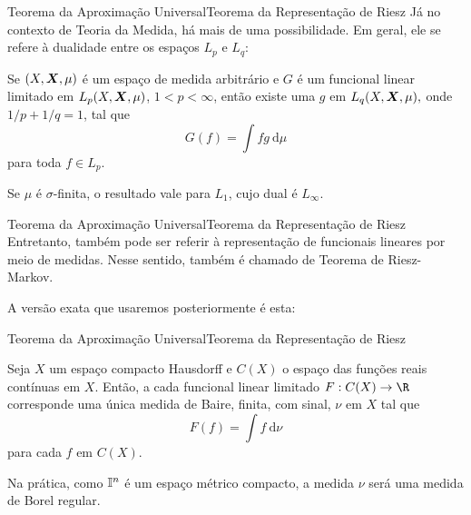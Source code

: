 \documentclass[13pt]{beamer}
\begin{document}
\begin{frame}{Teorema da Aproximação Universal}{Teorema da Representação de Riesz}%
    Já no contexto de Teoria da Medida, há mais de uma possibilidade.
    Em geral, ele se refere à dualidade entre os espaços \( L_{ p } \) e \( L_{ q } \):
    \begin{teo*}
        Se \( ( X, \bm{X}, \mu ) \) é um espaço de medida arbitrário e \( G \) é um funcional linear limitado em \( L_{ p } ( X, \bm{X}, \mu ) \), \( 1 < p < \infty \), então existe uma \( g \) em \( L_{ q } ( X, \bm{X}, \mu ), \) onde \( 1/p + 1/q = 1 \), tal que
        \begin{equation*}
            G ( f ) = \int f g \ \mathrm{d} \mu
        \end{equation*}
        para toda \( f \in L_{ p } \).
    \end{teo*}
    Se \( \mu \) é \( \sigma \)-finita, o resultado vale para \( L_{ 1 } \), cujo dual é \( L_{ \infty } \).
\end{frame}

\begin{frame}{Teorema da Aproximação Universal}{Teorema da Representação de Riesz}%
    Entretanto, também pode ser referir à representação de funcionais lineares por meio de medidas.
    Nesse sentido, também é chamado de Teorema de Riesz-Markov.

    A versão exata que usaremos posteriormente é esta:
\end{frame}

\begin{frame}{Teorema da Aproximação Universal}{Teorema da Representação de Riesz}%
    \begin{teo*}
        Seja \( X \) um espaço compacto Hausdorff e \( C ( X ) \) o espaço das funções reais contínuas em \( X \).
        Então, a cada funcional linear limitado \( F : C ( X ) \to \R \) corresponde uma única medida de Baire, finita, com sinal, \( \nu \) em \( X \) tal que
        \begin{equation*}
            F ( f ) = \int f \ \mathrm{d} \nu
        \end{equation*}
        para cada \( f \) em \( C ( X ) \).
    \end{teo*}
    Na prática, como \( \mathbb{I}^{ n } \) é um espaço métrico compacto, a medida \( \nu \) será uma medida de Borel regular.
\end{frame}
\end{document}
